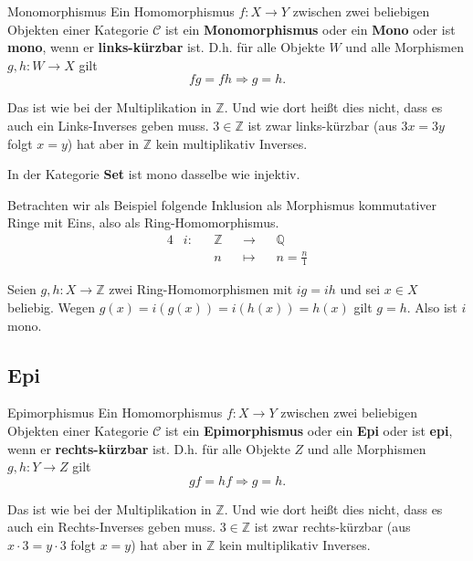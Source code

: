 \documentclass[a4paper]{amsart}
\theoremstyle{definition}
\newcommand{\Q}{\ensuremath{\mathbb{ Q }}}
\newcommand{\Z}{\ensuremath{\mathbb{ Z }}}
\newcommand{\CC}{\ensuremath{\mathcal{ C }}}
\begin{document}
\begin{Definition}{Monomorphismus}
   Ein Homomorphismus $f \colon X \to Y$ zwischen zwei beliebigen Objekten einer Kategorie $\CC$ ist ein \textbf{Monomorphismus} oder ein \textbf{Mono} oder ist \textbf{mono}, wenn er \textbf{links-kürzbar} ist. D.h. für alle Objekte $W$ und alle Morphismen $g,h \colon W \to X$ gilt
	\begin{equation}
      fg = fh \Rightarrow g = h.
	\end{equation}
\end{Definition}
Das ist wie bei der Multiplikation in $\Z$. Und wie dort heißt dies nicht, dass es auch ein Links-Inverses geben muss. $3 \in \Z$ ist zwar links-kürzbar (aus $3x = 3y$ folgt $x=y$) hat aber in $\Z$ kein multiplikativ Inverses.

In der Kategorie \textbf{Set} ist mono dasselbe wie injektiv.

Betrachten wir als Beispiel folgende Inklusion als Morphismus kommutativer Ringe mit Eins, also als Ring-Homomorphismus.
\begin{alignat}{4}
   &i \colon &&\Z &&\to     &&\Q\\
            &&&n &&\mapsto &&n = \frac{n}{1}
\end{alignat}

Seien $g,h \colon X \to \Z$ zwei Ring-Homomorphismen mit $ig = ih$ und sei $x \in X$ beliebig. Wegen $g(x) = i(g(x)) = i(h(x)) = h(x)$ gilt $g=h$. Also ist $i$ mono.

\subsection{Epi}

\begin{Definition}{Epimorphismus}
   Ein Homomorphismus $f \colon X \to Y$ zwischen zwei beliebigen Objekten einer Kategorie $\CC$ ist ein \textbf{Epimorphismus} oder ein \textbf{Epi} oder ist \textbf{epi}, wenn er \textbf{rechts-kürzbar} ist. D.h. für alle Objekte $Z$ und alle Morphismen $g,h \colon Y \to Z$ gilt
   \begin{equation}
      gf = hf \Rightarrow g = h.
   \end{equation}
\end{Definition}
Das ist wie bei der Multiplikation in $\Z$. Und wie dort heißt dies nicht, dass es auch ein Rechts-Inverses geben muss. $3 \in \Z$ ist zwar rechts-kürzbar (aus $x\cdot 3 = y \cdot 3$ folgt $x=y$) hat aber in $\Z$ kein multiplikativ Inverses.
\end{document}
